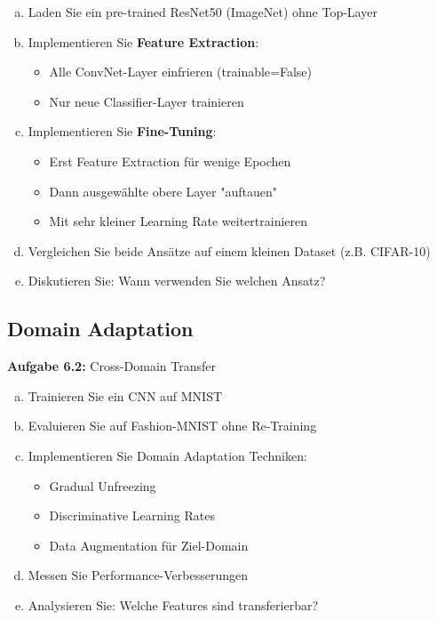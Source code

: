 \documentclass[12pt,a4paper]{article}
\begin{document}
\begin{enumerate}[(a)]
    \item Laden Sie ein pre-trained ResNet50 (ImageNet) ohne Top-Layer
    \item Implementieren Sie \textbf{Feature Extraction}:
    \begin{itemize}
        \item Alle ConvNet-Layer einfrieren (trainable=False)
        \item Nur neue Classifier-Layer trainieren
    \end{itemize}
    \item Implementieren Sie \textbf{Fine-Tuning}:
    \begin{itemize}
        \item Erst Feature Extraction für wenige Epochen
        \item Dann ausgewählte obere Layer "auftauen"
        \item Mit sehr kleiner Learning Rate weitertrainieren
    \end{itemize}
    \item Vergleichen Sie beide Ansätze auf einem kleinen Dataset (z.B. CIFAR-10)
    \item Diskutieren Sie: Wann verwenden Sie welchen Ansatz?
\end{enumerate}

\subsection{Domain Adaptation}

\textbf{Aufgabe 6.2:} Cross-Domain Transfer

\begin{enumerate}[(a)]
    \item Trainieren Sie ein CNN auf MNIST
    \item Evaluieren Sie auf Fashion-MNIST ohne Re-Training
    \item Implementieren Sie Domain Adaptation Techniken:
    \begin{itemize}
        \item Gradual Unfreezing
        \item Discriminative Learning Rates  
        \item Data Augmentation für Ziel-Domain
    \end{itemize}
    \item Messen Sie Performance-Verbesserungen
    \item Analysieren Sie: Welche Features sind transferierbar?
\end{enumerate}
\end{document}
